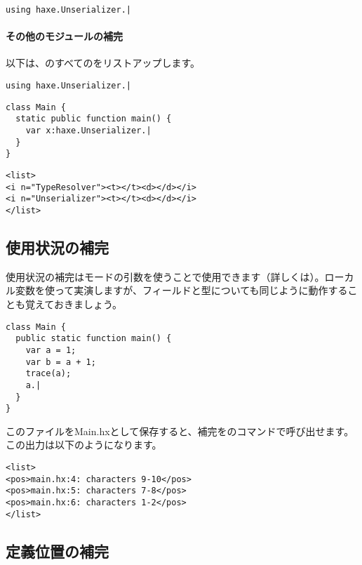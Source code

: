 \begin{lstlisting}
using haxe.Unserializer.|
\end{lstlisting}


\paragraph{その他のモジュールの補完}

以下は、のすべてのをリストアップします。

\begin{lstlisting}
using haxe.Unserializer.|
\end{lstlisting}

\begin{lstlisting}
class Main {
  static public function main() {
    var x:haxe.Unserializer.|
  }
}
\end{lstlisting}

\begin{lstlisting}
<list>
<i n="TypeResolver"><t></t><d></d></i>
<i n="Unserializer"><t></t><d></d></i>
</list>
\end{lstlisting}


\subsection{使用状況の補完}
\label{cr-completion-usage}

使用状況の補完はモードの引数を使うことで使用できます（詳しくは）。ローカル変数を使って実演しますが、フィールドと型についても同じように動作することも覚えておきましょう。

\begin{lstlisting}
class Main {
  public static function main() {
    var a = 1;
    var b = a + 1;
    trace(a);
    a.|
  }
}
\end{lstlisting}

このファイルをMain.hxとして保存すると、補完をのコマンドで呼び出せます。この出力は以下のようになります。

\begin{lstlisting}
<list>
<pos>main.hx:4: characters 9-10</pos>
<pos>main.hx:5: characters 7-8</pos>
<pos>main.hx:6: characters 1-2</pos>
</list>
\end{lstlisting}


\subsection{定義位置の補完}
\label{cr-completion-position}


